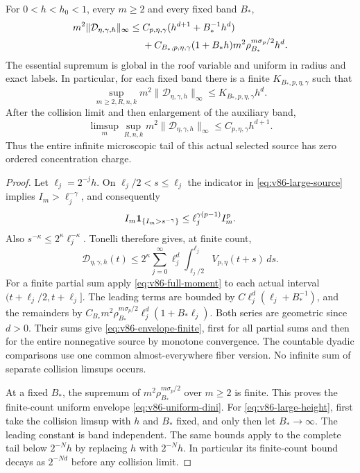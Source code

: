 \begin{theorem}
\label{thm:v86-envelope}
For $0<h<h_0<1$, every $m\ge2$ and every fixed band $B_*$,
\begin{align}
 m^2\|\mathcal D_{\eta,\gamma,h}\|_\infty
 \le{}&C_{p,\eta,\gamma}
              (h^{d+1}+B_*^{-1}h^d)\notag\\
 &+C_{B_*,p,\eta,\gamma}(1+B_*h)m^2
                    \rho_{B_*}^{m\sigma_p/2}h^d.
                                         \label{eq:v86-envelope-finite}
\end{align}
The essential supremum is global in the roof variable and uniform
in radius and exact labels. In particular, for each fixed band there
is a finite $K_{B_*,p,\eta,\gamma}$ such that
\begin{equation}\label{eq:v86-uniform-dini}
 \sup_{m\ge2,R,n,k}m^2\|\mathcal D_{\eta,\gamma,h}\|_\infty
                       \le K_{B_*,p,\eta,\gamma}h^d.
\end{equation}
After the collision limit and then enlargement of the auxiliary band,
\begin{equation}\label{eq:v86-large-height}
 \limsup_m\sup_{R,n,k}m^2\|\mathcal D_{\eta,\gamma,h}\|_\infty
                             \le C_{p,\eta,\gamma}h^{d+1}.
\end{equation}
Thus the entire infinite microscopic tail of this actual selected
source has zero ordered concentration charge.
\end{theorem}
\begin{proof}
Let $\ell_j=2^{-j}h$. On $\ell_j/2<s\le\ell_j$ the indicator
in \eqref{eq:v86-large-source} implies $I_m>\ell_j^{-\gamma}$,
and consequently
\[
 I_m\mathbf1_{\{I_m>s^{-\gamma}\}}
                       \le\ell_j^{\gamma(p-1)}I_m^p.
\]
Also $s^{-\kappa}\le2^\kappa\ell_j^{-\kappa}$. Tonelli therefore
gives, at finite count,
\begin{equation}\label{eq:v86-dyadic-majorant}
 \mathcal D_{\eta,\gamma,h}(t)
 \le2^\kappa\sum_{j=0}^{\infty}\ell_j^d
                \int_{\ell_j/2}^{\ell_j}V_{p,\eta}(t+s)\,ds.
\end{equation}
For a finite partial sum apply \eqref{eq:v86-full-moment} to each
actual interval $(t+\ell_j/2,t+\ell_j]$. The leading terms are
bounded by $C\ell_j^d(\ell_j+B_*^{-1})$, and the remainders by
$C_{B_*}m^2\rho_{B_*}^{m\sigma_p/2}
\ell_j^d(1+B_*\ell_j)$. Both series are geometric since $d>0$.
Their sums give \eqref{eq:v86-envelope-finite}, first for all
partial sums and then for the entire nonnegative source by monotone
convergence. The countable dyadic comparisons use one common
almost-everywhere fiber version. No infinite sum of separate
collision limsups occurs.

At a fixed $B_*$, the supremum of
$m^2\rho_{B_*}^{m\sigma_p/2}$ over $m\ge2$ is finite.
This proves the finite-count uniform envelope
\eqref{eq:v86-uniform-dini}. For \eqref{eq:v86-large-height}, first
take the collision limsup with $h$ and $B_*$ fixed, and only then
let $B_*\to\infty$. The leading constant is band independent.
The same bounds apply to the complete tail below $2^{-N}h$ by
replacing $h$ with $2^{-N}h$. In particular its finite-count bound
decays as $2^{-Nd}$ before any collision limit.
\end{proof}

